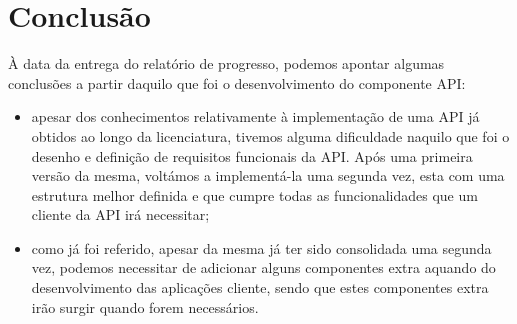 \section{Conclusão}
À data da entrega do relatório de progresso, podemos apontar algumas conclusões a partir daquilo que foi o desenvolvimento do componente API:

\begin{itemize}
	\item apesar dos conhecimentos relativamente à implementação de uma API já obtidos ao longo da licenciatura, tivemos alguma dificuldade naquilo que foi o desenho e definição de requisitos funcionais da API. Após uma primeira versão da mesma, voltámos a implementá-la uma segunda vez, esta com uma estrutura melhor definida e que cumpre todas as funcionalidades que um cliente da API irá necessitar;
	\item como já foi referido, apesar da mesma já ter sido consolidada uma segunda vez, podemos necessitar de adicionar alguns componentes extra aquando do desenvolvimento das aplicações cliente, sendo que estes componentes extra irão surgir quando forem necessários.
\end{itemize}